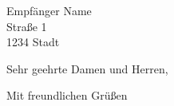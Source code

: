 \documentclass[paper=a4, fontsize=11pt]{scrlttr2}
\begin{document}
\begin{letter}{Empfänger Name\\Straße 1\\1234 Stadt}
	\opening{Sehr geehrte Damen und Herren,}
	\closing{Mit freundlichen Grüßen}
\end{letter}
\end{document}
